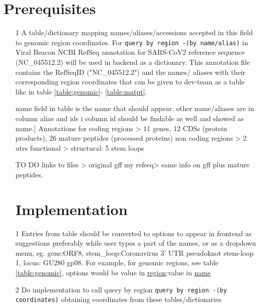 \documentclass[a4paper, 10pt]{article}        %
\begin{document}
\section{Prerequisites} 
\begin{itemize}

\item[1] A table/dictionary mapping names/aliases/accessions accepted in this field to genomic region coordinates. For \texttt{query by region -(by name/alias)} in Viral Beacon NCBI RefSeq annotation for SARS-CoV2 reference sequence (NC\_045512.2) will be used in backend as a dictionary. This annotation file contains the RefSeqID ("NC\_045512.2") and the names/ aliases with their corresponding region coordinates that can be given to dev-team as a table like in table \ref{table:genomic}- \ref{table:matpt}. 

name field in table is the name that should appear. other name/aliases are in column alias and ids i column id should be findable as well and showed as name.]
Annotations for 
coding regions > 11 genes, 12 CDSs (protein products), 26 mature peptides (processed proteins)
non coding regions > 2 utrs
functional > structural: 5 stem loops


	TO DO
links to files >
original gff
my refseq> same info on gff plus mature peptides.



\section{Implementation} 
\item[1] Entries from table should be converted to options to appear in frontend as suggestions preferably while user types a part of the names, or as a dropdown menu, eg. gene:ORF8, stem\_loop:Coronavirus 3' UTR pseudoknot stem-loop 1, locus: GU280 gp08. For example, for genomic regions, see table \ref{table:genomic}, options would be value in \underline{region}:value in  \underline{name}

\item[2] Do implementation to call query by region \texttt{query by region -(by coordinates)} obtaining coordinates from these tables/dictionaries
\end{itemize}
\end{document}
